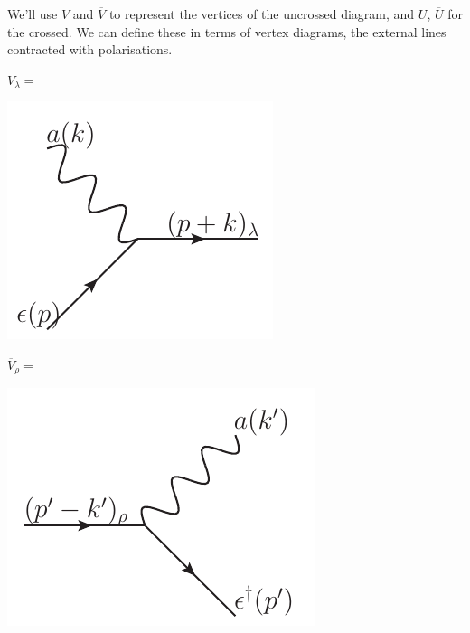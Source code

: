 We'll use $V$ and $\overline{V}$ to represent the vertices of the uncrossed diagram, and $U$, $\overline{U}$ for the crossed.  We can define these in terms of vertex diagrams, the external lines contracted with polarisations.


$V_\lambda = $
\begin{minipage}{1in}
   \includegraphics[scale=0.7]{eps/V-lambda} 
\end{minipage}
\hspace{8em}
$\overline{V}_\rho = $
\begin{minipage}{1in}
   \includegraphics[scale=0.7]{eps/V-bar-rho} 
\end{minipage}




